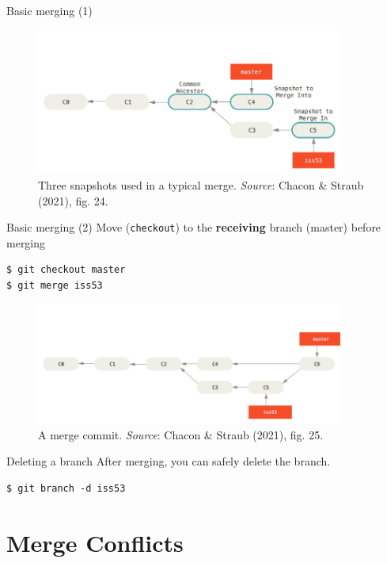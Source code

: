 \documentclass[handout]{beamer}
\begin{document}
\begin{frame}{Basic merging (1)}
\begin{figure}
	\includegraphics[width=0.9\textwidth]{figures/fig24_pre_merge.png}
	\caption{Three snapshots used in a typical merge. \textit{Source}: Chacon \& Straub (2021), fig. 24.}
\end{figure}
\end{frame}

\begin{frame}[fragile]{Basic merging (2)}
Move (\texttt{checkout}) to the \textbf{receiving} branch ({master}) before merging
\begin{lstlisting}
$ git checkout master
$ git merge iss53
\end{lstlisting}
\begin{figure}
	\includegraphics[width=0.9\textwidth]{figures/fig25_merge.png}
	\caption{A merge commit. \textit{Source}: Chacon \& Straub (2021), fig. 25.}
\end{figure}
\end{frame}

\begin{frame}[fragile]{Deleting a branch}
After merging, you can safely delete the branch. 
\begin{lstlisting}
$ git branch -d iss53
\end{lstlisting}
\end{frame}

\section{Merge Conflicts}
\end{document}
